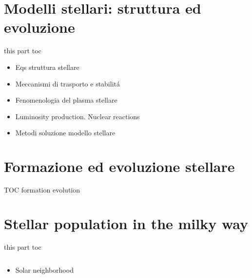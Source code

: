 \documentclass[8pt,xcolor,fleqn]{beamer}
\makeatletter
\newcommand{\linkdest}[2][\@empty]{%
    \hypertarget{\@empty}{#1}
\Hy@raisedlink{%
\hypertarget{#2}{}
}%
}
\makeatother
\begin{document}
\part{Modelli stellari: struttura ed evoluzione}%
\begin{frame}{this part toc}
\begin{itemize}
\item Eqs struttura stellare
\item Meccanismi di trasporto e stabilit\'a
\item Fenomenologia del plasma stellare
\item Luminosity production. Nuclear reactions
\item Metodi soluzione modello stellare
\end{itemize}
\end{frame}

 
  \part{Formazione ed evoluzione stellare} 
\begin{frame}{TOC formation evolution}
\tableofcontents
\end{frame}


 
 \part{Stellar population in the milky way}%
\begin{frame}{this part toc}
\begin{columns}[T]
\begin{column}{0.5\textwidth}
\begin{itemize}
	\item Solar neighborhood
\end{itemize}
\end{column}
\begin{column}{0.5\textwidth}
\tableofcontents
\end{column}
\end{columns}
\end{frame}

  
\end{document}
